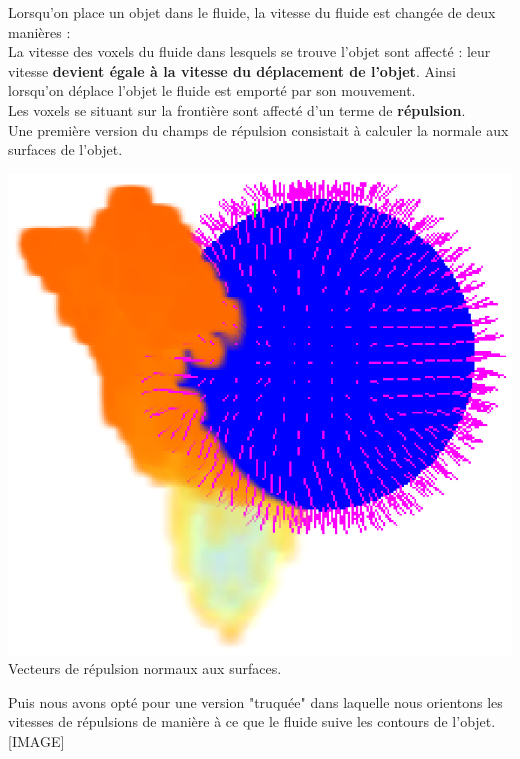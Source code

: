 \documentclass[a4paper,10pt]{article}
\begin{document}
    Lorsqu'on place un objet dans le fluide, la vitesse du fluide est changée de deux manières :\\
    La vitesse des voxels du fluide dans lesquels se trouve l'objet sont affecté : leur vitesse \textbf{devient égale à la vitesse du déplacement de l'objet}. Ainsi lorsqu'on déplace l'objet le fluide est emporté par son mouvement.\\
    Les voxels se situant sur la frontière sont affecté d'un terme de \textbf{répulsion}. \\
    
    
    Une première version du champs de répulsion consistait à calculer la normale aux surfaces de l'objet.\\
    
    \begin{center}
	\includegraphics[scale=0.7]{Contour.ps}\\
	Vecteurs de répulsion normaux aux surfaces.
    \end{center}
    
    Puis nous avons opté pour une version "truquée" dans laquelle nous orientons les vitesses de répulsions de manière à ce que le fluide suive les contours de l'objet. \\
    


    [IMAGE]\\
\end{document}
